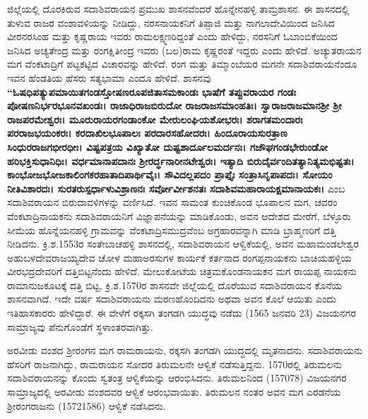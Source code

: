 ಜಿಲ್ಲೆಯಲ್ಲಿ ದೊರಕಿರುವ ಸದಾಶಿವರಾಯನ ಪ್ರಮುಖ ಶಾಸನವೆಂದರೆ ಹೊನ್ನೇನಹಳ್ಳಿ ತಾಮ್ರಶಾಸನ. ಈ ಶಾಸನದಲ್ಲಿ ತುಳುವ ರಾಜರ ವಂಶಾವಳಿಯನ್ನು ನೀಡಿದ್ದು, ನರಸನಾಯಕನಿಗೆ ತಿಪ್ಪಾಜಿ ಮತ್ತು ನಾಗಲಾದೇವಿಯಿಂದ ಜನಿಸಿದ ವೀರನರಸಿಂಹ ಮತ್ತು ಕೃಷ್ಣರಾಯ ಇವರು ರಾಮಲಕ್ಷ್ಮಣರಿದ್ದಂತೆ ಎಂದು ಹೇಳಿದ್ದು, ನರಸನಿಗೆ ಓಬಾಂಬಿಕೆಯಿಂದ ಜನಿಸಿದ ಅಚ್ಯತೇಂದ್ರ ಮತ್ತು ರಂಗಕ್ಷಿತೀಂದ್ರ ಇವರು (ಬಲ)ರಾಮ ಕೃಷ್ಣರಂತೆ ಇದ್ದರು ಎಂದು ಹೇಳಿದೆ. ಅಚ್ಯುತರಾಯನ ಮಗ ವೆಂಕಟಾದ್ರಿಗೆ ಪಟ್ಟಕಟ್ಟಿದ ವಿಚಾರವನ್ನು ಹೇಳಿದೆ. ರಂಗ ಮತ್ತು ತಿಮ್ಮಾಂಬೆಯರ ಮಗನೇ ಸದಾಶಿವರಾಯನೆಂದೂ ಇವನ ಹೆಂಡತಿಯ ಹೆಸರು ಸತ್ಯಭಾಮಾ ಎಂದೂ ಹೇಳಿದೆ. ಶಾಸನವು \textbf{“ಓಷಧಿಪತ್ಯುಪಮಾಯಿತಗಂಡಸ್ತೋಷಣರೂಪಜಿತಾಸಮಕಾಂಡಃ ಭಾಷೆಗೆ ತಪ್ಪುವರಾಯರ ಗಂಡಃ ಪೋಷಣನಿರ್ಭರಭೂನವಖಂಡಃ। ರಾಜಾಧಿರಾಜಬಿರುದೋ ರಾಜರಾಜಸಮಾಂಹತಿಃ। ಸ್ವಾರಾಜರಾಜ\-ಮಾನಶ‍್ರೀ ಶ‍್ರೀ ರಾಜಪರಮೇಶ್ವರಃ। ಮೂರುರಾಯರಗಂಡಾಂಕೋ ಮೇರುಲಂಘಿಯಶೋಭರಃ। ಶರಾಗತಮಂದಾರಃ ಪರರಾಜಭಯಂಕರಃ। ಕರದಾಖಿಲಭೂಪಾಲಃ ಪರದಾರಸಹೋದರಃ। ಹಿಂದೂರಾಯಸುರತ್ರಾಣ ಸಿಂಧುರರಾಜಗಭೀರಧೀಃ। ವಿಷ್ಟಪತ್ರಯ ವಿಖ್ಯಾತೋ ದುಷ್ಟಶಾರ್ದೂಲಮರ್ದನಃ। ಗಜೌಘಗಂಡಭೇರುಂಡೋ ಹರಿಭಕ್ತಿಸುಧಾನಿಧಿಃ। ವರ್ಧಮಾನಾಪದಾನಃ ಶ‍್ರೀರರ್ದ್ಧನಾರೀನಟೇಶ್ವರಃ। ಇತ್ಯಾದಿ ಬಿರುದೈರ್ವಂದಿತತ್ಯಾನಿತ್ಯಮಭಿಷ್ಟತಃ। ಕಾಂಭೋಜಭೋಜಕಾಲಿಂಗಕರಹಾತಾದಿಪಾರ್ಥಿವೈಃ। ಸೌವಿದಲ್ಲಪದಂ ಪ್ರಾಪ್ತೈಃ ಸಂತ್ರಾಸಿನೃಪಾಪದಃ। ಸೋಯಂ ನೀತಿವಿಶಾರದಃ। ಸುರತರುಸ್ಪರ್ಧಾಳುವಿಶ್ರಾಣನಃ ಸರ್ವೋರ್ವೀಶನತಃ ಸದಾಶಿವಮಹಾರಾಯ\-ಕ್ಷಮಾನಾಯಕಃ।} ಎಂಬ ಸದಾಶಿವರಾಯನ ಬಿರುದಾವಳಿಗಳನ್ನು ವರ್ಣಿಸಿದೆ. ಇವನ ಸಾಮಂತ ಕುಂಚಿಕೊಂಡ ಭೂಪಾಲನ ಮಗ, ಚವರಂ ವೆಂಕಟಾದ್ರಿನಾಯಕನು ಸದಾಶಿವರಾಯನಿಗೆ ವಿಜ್ಞಾಪನೆಯನ್ನು ಮಾಡಿಕೊಂಡು, ಅವನ ಆದೇಶದ ಮೇರೆಗೆ, ಬೆಳ್ಳೂರು ಸೀಮೆಯ ಹೊನ್ನೆಯನಹಳ್ಳಿ ಗ್ರಾಮವನ್ನು ವೆಂಕಟಾದ್ರಿಸಮುದ್ರವೆಂಬ ಅಗ್ರಹಾರವನ್ನಾಗಿ ಮಾಡಿ ಬ್ರಾಹ್ಮಣರಿಗೆ ದತ್ತಿ ನೀಡಿದನು. ಕ್ರಿ.ಶ.1553ರ ಸಂತೇಬಾಚಹಳ್ಳಿ ಶಾಸನದಲ್ಲಿ, ಸದಾಶಿವರಾಯನ ಆಳ್ವಿಕೆಯಲ್ಲಿ, ಅವನ ಮಹಾಮಂಡಲೇಶ್ವರ ಅಹುಬಳದೇವರಾಜಯ್ಯದೇವ ಚೋಳ ಮಹಾಅರಸುಗಳ ಕಾರ್ಯಕೆ ಕರ್ತನಾದ ರಂಗಪ್ಪನಾಯಕನು ಬಾಚಿಯಹಳ್ಳಿಯ ವೀರಭದ್ರದೇವರಿಗೆ ದತ್ತಿಬಿಟ್ಟನೆಂದು ಹೇಳಿದೆ. ಮೇಲುಕೋಟೆಯ ಚಿತ್ರಮಕೊಂಡನಾಯಕನ ಮಗ ರಾಯಪ್ಪ ನಾಯಕನು ರಾಮಾನುಜಕೂಟಕ್ಕೆ ದತ್ತಿ ಬಿಟ್ಟ, ಕ್ರಿ.ಶ.1570ರ ಶಾಸನವೇ ಜಿಲ್ಲೆಯಲ್ಲಿ ದೊರೆಯುವ ಸದಾಶಿವರಾಯನ ಕೊನೆಯ ಶಾಸನವಾಗಿದೆ. ಇದೇ ವರ್ಷ ಸದಾಶಿವರಾಯನು ಮರಣಹೊಂದಿದನು ಅಥವಾ ಅವನ ಕೊಲೆ ಆಯಿತು ಎಂದು ಇತಿಹಾಸಕಾರರು ಹೇಳಿದ್ದಾರೆ. ಈ ವೇಳೆಗೆ ರಕ್ಕಸಗಿ ತಂಗಡಗಿ ಯುದ್ಧವು ನಡೆದು (1565 ಜನವರಿ 23) ವಿಜಯನಗರ ಸಾಮ್ರಾಜ್ಯವು ಪೆನುಗೊಂಡೆಗೆ ಸ್ಥಳಾಂತರವಾಗಿತ್ತು.

ಅರವೀಡು ವಂಶದ ಶ‍್ರೀರಂಗನ ಮಗ ರಾಮರಾಯನು, ರಕ್ಕಸಗಿ ತಂಗಡಗಿ ಯುದ್ಧದಲ್ಲಿ ಮೃತನಾದನು. ಸದಾಶಿವರಾಯನು ಹೆಸರಿಗೆ ರಾಜನಾಗಿದ್ದು, ರಾಮರಾಯನ ಸೋದರ ತಿರುಮಲನೇ ಆಳ್ವಿಕೆ ನಡೆಸುತ್ತಿದ್ದನು. 1570ರಲ್ಲಿ ತಿರುಮಲನು ಸದಾಶಿವರಾಯನನ್ನು ಕೊಂದು ಸ್ವತಂತ್ರ ಆಳ್ವಿಕೆಯನ್ನು ಆರಂಭಿಸಿದನು. ತಿರುಮಲನಿಂದ (1570\enginline{-}78) ವಿಜಯನಗರ ಸಾಮ್ರಾಜ್ಯದಲ್ಲಿ ಅರವೀಡು ವಂಶದವರ ಆಳ್ವಿಕೆ ಆರಂಭವಾಯಿತು. ತಿರುಮಲನ ನಂತರ ಅವನ ಮಗ ಎರಡನೆಯ ಶ‍್ರೀರಂಗರಾಜನು (1572\enginline{-}1586) ಆಳ್ವಿಕೆ ನಡೆಸಿದನು.

